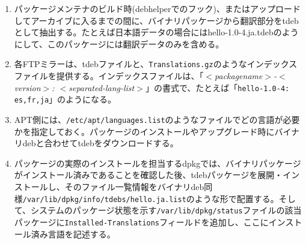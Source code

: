 \documentclass[mingoth,a4paper]{jsarticle}
\begin{document}
\begin{enumerate}
\item パッケージメンテナのビルド時(debhelperでのフック)、またはアップロードしてアーカイブに入るまでの間に、バイナリパッケージから翻訳部分をtdebとして抽出する。たとえば日本語データの場合にはhello-1.0-4.ja.tdebのようにして、このパッケージには翻訳データのみを含める。
\item 各FTPミラーは、tdebファイルと、\texttt{Translations.gz}のようなインデックスファイルを提供する。インデックスファイルは、「\emph{$<$packagename$>$-$<$version$>$: $<$separated-lang-list$>$}」の書式で、たとえば「\texttt{hello-1.0-4: es,fr,ja}」のようになる。
\item APT側には、\texttt{/etc/apt/languages.list}のようなファイルでどの言語が必要かを指定しておく。パッケージのインストールやアップグレード時にバイナリdebと合わせてtdebをダウンロードする。
\item パッケージの実際のインストールを担当するdpkgでは、バイナリパッケージがインストール済みであることを確認した後、tdebパッケージを展開・インストールし、そのファイル一覧情報をバイナリdeb同様\texttt{/var/lib/dpkg/info/tdebs/hello.ja.list}のような形で配置する。そして、システムのパッケージ状態を示す\texttt{/var/lib/dpkg/status}ファイルの該当パッケージに\texttt{Installed-Translations}フィールドを追加し、ここにインストール済み言語を記述する。
\end{enumerate}




\end{document}
